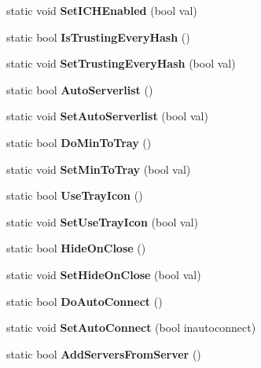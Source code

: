 \begin{DoxyCompactItemize}
\item 
static void {\bfseries SetICHEnabled} (bool val)\label{classCPreferences_a0dcd3e72d87a2420deae2e79e47ce46e}

\item 
static bool {\bfseries IsTrustingEveryHash} ()\label{classCPreferences_a91910ec5e60677487e0f438a88d9d608}

\item 
static void {\bfseries SetTrustingEveryHash} (bool val)\label{classCPreferences_a191305d404fb5882b21986c6ed658e75}

\item 
static bool {\bfseries AutoServerlist} ()\label{classCPreferences_a77b82543713b8afe60f686505b2e5fe0}

\item 
static void {\bfseries SetAutoServerlist} (bool val)\label{classCPreferences_ac9cf08af8d87c83a5e8668b2e9c19d98}

\item 
static bool {\bfseries DoMinToTray} ()\label{classCPreferences_aa0f0812e8f8b51daddd7206bf66b51d5}

\item 
static void {\bfseries SetMinToTray} (bool val)\label{classCPreferences_ad24157f790eb33830081b410641b4754}

\item 
static bool {\bfseries UseTrayIcon} ()\label{classCPreferences_a2cc533b4b9ef16da2f48ed5c02eca62e}

\item 
static void {\bfseries SetUseTrayIcon} (bool val)\label{classCPreferences_a9840384fa4d5ce9a73800cce13f1243e}

\item 
static bool {\bfseries HideOnClose} ()\label{classCPreferences_a8cc2c5e78bd07f470e246d6c2ed6f2c7}

\item 
static void {\bfseries SetHideOnClose} (bool val)\label{classCPreferences_ab0cff9a3e5c61b9b53398a8c531cd14a}

\item 
static bool {\bfseries DoAutoConnect} ()\label{classCPreferences_a6a4202fd692fe048899ae927b7828497}

\item 
static void {\bfseries SetAutoConnect} (bool inautoconnect)\label{classCPreferences_abd687f82bdcdebaa27c3769a878f2d5f}

\item 
static bool {\bfseries AddServersFromServer} ()\label{classCPreferences_a7c59b3bf83307ddd8c6997d475d79d03}


\end{DoxyCompactItemize}
